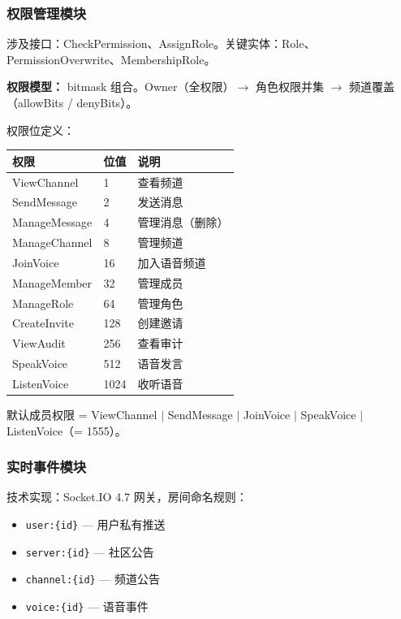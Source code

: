 \subsubsection{权限管理模块}

涉及接口：CheckPermission、AssignRole。关键实体：Role、PermissionOverwrite、MembershipRole。

\textbf{权限模型：} bitmask 组合。Owner（全权限）$\to$ 角色权限并集 $\to$ 频道覆盖（allowBits / denyBits）。

权限位定义：
\begin{center}
\begin{tabularx}{\textwidth}{L{3cm}L{3cm}Y}
\toprule
\textbf{权限} & \textbf{位值} & \textbf{说明} \\
\midrule
ViewChannel & 1 & 查看频道 \\
SendMessage & 2 & 发送消息 \\
ManageMessage & 4 & 管理消息（删除）\\
ManageChannel & 8 & 管理频道 \\
JoinVoice & 16 & 加入语音频道 \\
ManageMember & 32 & 管理成员 \\
ManageRole & 64 & 管理角色 \\
CreateInvite & 128 & 创建邀请 \\
ViewAudit & 256 & 查看审计 \\
SpeakVoice & 512 & 语音发言 \\
ListenVoice & 1024 & 收听语音 \\
\bottomrule
\end{tabularx}
\end{center}
默认成员权限 = ViewChannel $|$ SendMessage $|$ JoinVoice $|$ SpeakVoice $|$ ListenVoice（= 1555）。

\subsubsection{实时事件模块}

技术实现：Socket.IO 4.7 网关，房间命名规则：
\begin{itemize}[itemsep=0pt]
  \item \texttt{user:\{id\}} --- 用户私有推送
  \item \texttt{server:\{id\}} --- 社区公告
  \item \texttt{channel:\{id\}} --- 频道公告
  \item \texttt{voice:\{id\}} --- 语音事件
\end{itemize}

